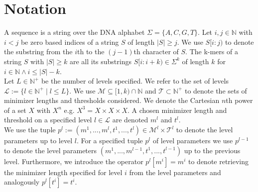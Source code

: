 \documentclass[a4paper,titlepage,onecolumn,oneside,12pt,nenglish,titlepage=firstiscover]{scrbook}
\theoremstyle{plain} %
\theoremstyle{definition} %
\theoremstyle{remark} %
\theoremstyle{plain}
\newcommand{\NN}{\mathbb{N}} %
\newcommand{\minimizerLength}{m}
\newcommand{\threshold}{t}
\newcommand{\level}{l}
\newcommand{\possibleMinimizerLengths}{\mathcal{M}}
\newcommand{\possibleThresholds}{\mathcal{T}}
\begin{document}
\chapter{Notation}\label{chap:notation}
\newcommand{\numberOfLevels}{{L}}
\newcommand{\setOfLevels}{\mathcal{L}}

\newcommand{\levelParameters}[1]{p^{#1}}
\newcommand{\varLevelParameters}[1]{\textbf{p}^{#1}}
\newcommand{\parameterAccess}[3]{\levelParameters{#1}[#2^{#3}]}

\newcommand{\frequencyOf}[1]{freq(#1)}
\newcommand{\minimizerOf}[2]{min^{\hashfunction{#2}}_{\minimizerLength^{#2}}(#1)}

\newcommand{\sequences}[1]{S_{\levelParameters{#1}}}
\newcommand{\substring}[3]{#1[#2:#3)}
A sequence is a string over the DNA alphabet $\Sigma = \{A,C,G,T\}$. Let $i,j \in \NN$ with $i < j$ be zero based indices of a string $S$ of length $|S| \geq j$. We use $\substring{S}{i}{j}$ to denote the substring from the $i$th to the $(j-1)$th character of $S$.
The k-mers of a string $S$ with $|S|\geq k$ are all its substrings $S[i:i+k) \in \Sigma^k$ of length $k$ for $i \in \NN \wedge i \leq |S|-k$.\\
Let $\numberOfLevels \in \NN^+$ be the number of levels specified. We refer to the set of levels $\setOfLevels := \{ \level \in \NN^+ \mid \level \leq \numberOfLevels \}$. We use $\possibleMinimizerLengths \subseteq [1,k) \cap \NN$ and $\possibleThresholds \subset \NN^+$ to denote the sets of minimizer lengths and thresholds considered. We denote the Cartesian $n$th power of a set $X$ with $X^n$ e.g. $X^3 = X \times X \times X$. A chosen minimizer length and threshold on a specified level $\level \in \setOfLevels$ are denoted $\minimizerLength^\level$ and $\threshold^\level$.\\
We use the tuple $\levelParameters{\level} := (\minimizerLength^1, ..., \minimizerLength^\level, \threshold^1, ..., \threshold^\level) \in \possibleMinimizerLengths^\level \times \possibleThresholds^\level$ to denote the level parameters up to level $\level$. For a specified tuple $\levelParameters{\level}$ of level parameters we use $\levelParameters{\level-1}$ to denote the level parameters $(\minimizerLength^1, ..., \minimizerLength^{\level-1}, \threshold^1, ..., \threshold^{\level-1})$ up to the previous level. Furthermore, we introduce the operator $\parameterAccess{\level}{\minimizerLength}{i} = \minimizerLength^i$ to denote retrieving the minimizer length specified for level $i$ from the level parameters and analogously $\parameterAccess{\level}{\threshold}{i}  = \threshold^i$.\\
\end{document}
